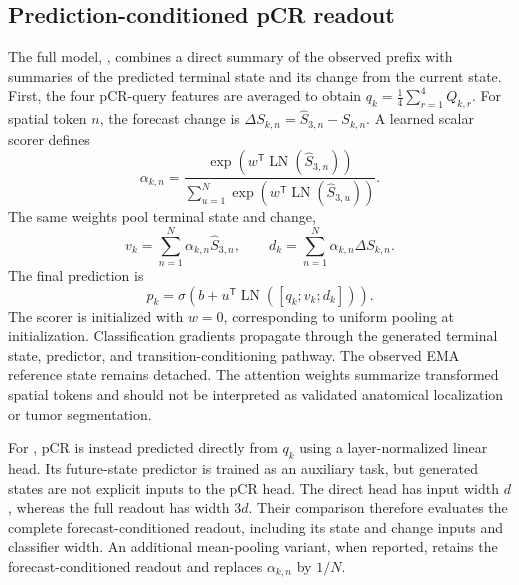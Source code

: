 \subsection{Prediction-conditioned pCR readout}
\label{sec:readout}
The full model, \fullmodel{}, combines a direct summary of the observed prefix with summaries of the predicted terminal state and its change from the current state. First, the four pCR-query features are averaged to obtain $q_k=\frac14\sum_{r=1}^{4}Q_{k,r}$. For spatial token $n$, the forecast change is $\Delta S_{k,n}=\widehat S_{3,n}-S_{k,n}$. A learned scalar scorer defines
\begin{equation}
 \alpha_{k,n}=
 \frac{\exp\!\left(w^{\mathsf T}\operatorname{LN}(\widehat S_{3,n})\right)}
 {\sum_{u=1}^{N}\exp\!\left(w^{\mathsf T}\operatorname{LN}(\widehat S_{3,u})\right)}.
\end{equation}
The same weights pool terminal state and change,
\begin{equation}
 v_k=\sum_{n=1}^{N}\alpha_{k,n}\widehat S_{3,n},
 \qquad
 d_k=\sum_{n=1}^{N}\alpha_{k,n}\Delta S_{k,n}.
\end{equation}
The final prediction is
\begin{equation}
 p_k=\sigma\!\left(b+u^{\mathsf T}
 \operatorname{LN}\!\left([q_k;v_k;d_k]\right)\right).
\end{equation}
The scorer is initialized with $w=0$, corresponding to uniform pooling at initialization. Classification gradients propagate through the generated terminal state, predictor, and transition-conditioning pathway. The observed EMA reference state remains detached. The attention weights summarize transformed spatial tokens and should not be interpreted as validated anatomical localization or tumor segmentation.

For \direct{}, pCR is instead predicted directly from $q_k$ using a layer-normalized linear head. Its future-state predictor is trained as an auxiliary task, but generated states are not explicit inputs to the pCR head. The direct head has input width $d$, whereas the full readout has width $3d$. Their comparison therefore evaluates the complete forecast-conditioned readout, including its state and change inputs and classifier width. An additional mean-pooling variant, when reported, retains the forecast-conditioned readout and replaces $\alpha_{k,n}$ by $1/N$.

